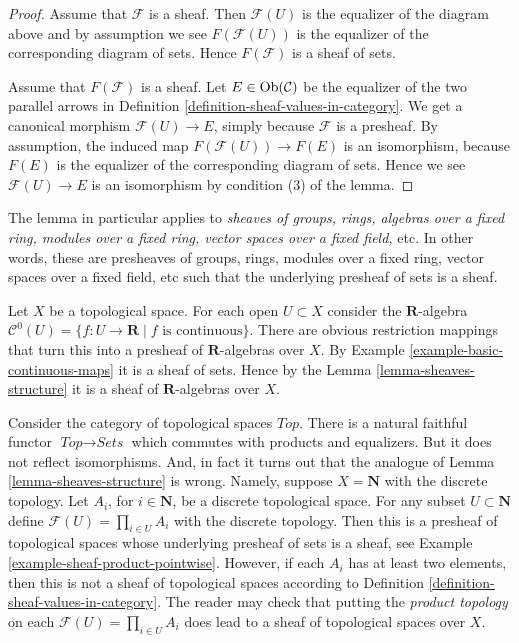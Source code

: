 \begin{proof}
Assume that $\mathcal{F}$ is a sheaf. Then
$\mathcal{F}(U)$ is the equalizer of the diagram
above and by assumption we see $F(\mathcal{F}(U))$
is the equalizer of the corresponding diagram
of sets. Hence $F(\mathcal{F})$ is a sheaf of sets.

\medskip\noindent
Assume that $F(\mathcal{F})$ is a sheaf.
Let $E \in \mathop{\mathrm{Ob}}\nolimits(\mathcal{C})$ be the
equalizer of the two parallel arrows in
Definition \ref{definition-sheaf-values-in-category}.
We get a canonical morphism $\mathcal{F}(U) \to E$,
simply because $\mathcal{F}$ is a presheaf.
By assumption, the induced map $F(\mathcal{F}(U)) \to F(E)$
is an isomorphism, because $F(E)$ is the equalizer
of the corresponding diagram of sets. Hence we
see $\mathcal{F}(U) \to E$ is an isomorphism
by condition (3) of the lemma.
\end{proof}

\noindent
The lemma in particular applies to
{\it sheaves of groups, rings, algebras over a fixed ring, modules
over a fixed ring, vector spaces over a fixed field, } etc.
In other words, these are presheaves of groups, rings,
modules over a fixed ring, vector spaces over a fixed field, etc
such that the underlying presheaf of sets is a sheaf.

\begin{example}
\label{example-C0-sheaf-rings}
Let $X$ be a topological space. For each open $U \subset X$ consider
the $\mathbf{R}$-algebra
$\mathcal{C}^{0}(U) = \{ f : U \to \mathbf{R} \mid f\text{ is continuous}\}$.
There are obvious restriction mappings that turn this into a
presheaf of $\mathbf{R}$-algebras over $X$.
By Example \ref{example-basic-continuous-maps} it is a sheaf of sets.
Hence by the Lemma \ref{lemma-sheaves-structure} it is a sheaf of
$\mathbf{R}$-algebras over $X$.
\end{example}

\begin{example}
\label{example-sheaves-topological-spaces}
Consider the category of topological spaces $\textit{Top}$.
There is a natural faithful functor $\textit{Top} \to \textit{Sets}$
which commutes with products and equalizers. But it does
not reflect isomorphisms. And, in fact it turns out that
the analogue of Lemma \ref{lemma-sheaves-structure} is wrong.
Namely, suppose $X = \mathbf{N}$ with the discrete
topology. Let $A_i$, for $i \in \mathbf{N}$, be a discrete
topological space. For any subset $U \subset \mathbf{N}$
define $\mathcal{F}(U) = \prod_{i\in U} A_i$ with the
discrete topology. Then this is a presheaf of topological
spaces whose underlying presheaf of sets is a sheaf, see
Example \ref{example-sheaf-product-pointwise}.
However, if each $A_i$ has at least two elements, then
this is not a sheaf of topological spaces
according to Definition \ref{definition-sheaf-values-in-category}.
The reader may check that putting the {\it product topology} on
each $\mathcal{F}(U) = \prod_{i\in U} A_i$ does lead to a sheaf
of topological spaces over $X$.
\end{example}


